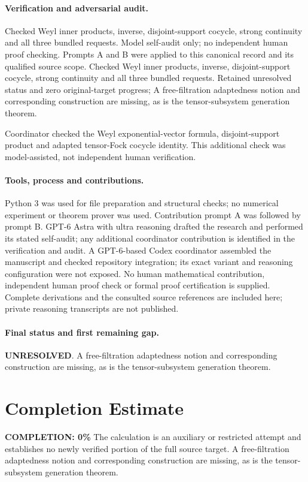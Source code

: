 \documentclass[11pt]{article}
\begin{document}
\paragraph{Verification and adversarial audit.}
Checked Weyl inner products, inverse, disjoint-support cocycle, strong continuity and all three bundled requests. Model self-audit only; no independent human proof checking. Prompts A and B were applied to this canonical record and its qualified source scope. Checked Weyl inner products, inverse, disjoint-support cocycle, strong continuity and all three bundled requests. Retained unresolved status and zero original-target progress; A free-filtration adaptedness notion and corresponding construction are missing, as is the tensor-subsystem generation theorem.

Coordinator checked the Weyl exponential-vector formula, disjoint-support product and adapted tensor-Fock cocycle identity. This additional check was model-assisted, not independent human verification.

\paragraph{Tools, process and contributions.}
Python 3 was used for file preparation and structural checks; no numerical experiment or theorem prover was used. Contribution prompt A was followed by prompt B. GPT-6 Astra with ultra reasoning drafted the research and performed its stated self-audit; any additional coordinator contribution is identified in the verification and audit. A GPT-6-based Codex coordinator assembled the manuscript and checked repository integration; its exact variant and reasoning configuration were not exposed. No human mathematical contribution, independent human proof check or formal proof certification is supplied. Complete derivations and the consulted source references are included here; private reasoning transcripts are not published.

\paragraph{Final status and first remaining gap.}
\textbf{UNRESOLVED}. A free-filtration adaptedness notion and corresponding construction are missing, as is the tensor-subsystem generation theorem.

\section{Completion Estimate}
\noindent\textbf{COMPLETION: 0\%}
The calculation is an auxiliary or restricted attempt and establishes no newly verified portion of the full source target. A free-filtration adaptedness notion and corresponding construction are missing, as is the tensor-subsystem generation theorem.
\end{document}
